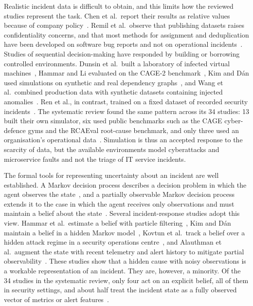 Realistic incident data is difficult to obtain, and this limits how the reviewed studies represent the task. Chen et al.\ report their results as relative values because of company policy~\cite{chen2020}. Remil et al.\ observe that publishing datasets raises confidentiality concerns, and that most methods for assignment and deduplication have been developed on software bug reports and not on operational incidents~\cite{remil2024}. Studies of sequential decision-making have responded by building or borrowing controlled environments. Dunsin et al.\ built a laboratory of infected virtual machines~\cite{dunsin2025}, Hammar and Li evaluated on the CAGE-2 benchmark~\cite{hammar2025}, Kim and D\'{a}n used simulations on synthetic and real dependency graphs~\cite{kim2025}, and Wang et al.\ combined production data with synthetic datasets containing injected anomalies~\cite{wang2023hrlhf}. Ren et al., in contrast, trained on a fixed dataset of recorded security incidents~\cite{ren2025}. The systematic review found the same pattern across its 34 studies: 13 built their own simulator, six used public benchmarks such as the CAGE cyber-defence gyms and the RCAEval root-cause benchmark, and only three used an organisation's operational data~\cite{opol2026slr}. Simulation is thus an accepted response to the scarcity of data, but the available environments model cyberattacks and microservice faults and not the triage of IT service incidents.

The formal tools for representing uncertainty about an incident are well established. A Markov decision process describes a decision problem in which the agent observes the state~\cite{sutton2018}, and a partially observable Markov decision process extends it to the case in which the agent receives only observations and must maintain a belief about the state~\cite{kaelbling1998}. Several incident-response studies adopt this view. Hammar et al.\ estimate a belief with particle filtering~\cite{hammar2026belief}, Kim and D\'{a}n maintain a belief in a hidden Markov model~\cite{kim2025}, Kovtun et al.\ track a belief over a hidden attack regime in a security operations centre~\cite{kovtun2026}, and Alauthman et al.\ augment the state with recent telemetry and alert history to mitigate partial observability~\cite{alauthman2026}. These studies show that a hidden cause with noisy observations is a workable representation of an incident. They are, however, a minority. Of the 34 studies in the systematic review, only four act on an explicit belief, all of them in security settings, and about half treat the incident state as a fully observed vector of metrics or alert features~\cite{opol2026slr}.

